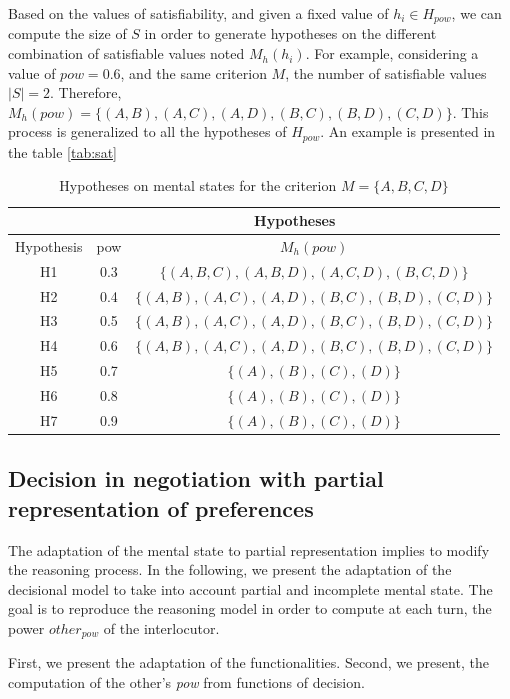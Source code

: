 \documentclass[sigconf]{aamas}  %
\begin{document}
	Based on the values of satisfiability, and given a fixed value of $h_i \in H_{pow}$, we can compute the size of $S$ in order to generate hypotheses on the different combination of satisfiable values  noted $M_h(h_i)$. For example, considering a value of $pow =0.6$, and the same criterion $M$, the number of satisfiable values $|S| = 2$. Therefore, $M_h(pow) = \{(A,B), (A,C), (A,D), (B,C), (B,D), (C,D)\}$. This process is generalized to all the hypotheses of $H_{pow}$. An example is presented in the table \ref{tab:sat}
	
	
	
	
	\begin{table}[h]
		\centering
		\caption{Hypotheses on mental states for the criterion $M=\{A, B, C, D\}$}
		\begin{tabular}{ |c|c|c| }
			\hline
			& \multicolumn{2}{c|}{Hypotheses}  \\
			\hline
			Hypothesis & pow & $M_h(pow)$ \\
			\hline
			H1&0.3&$\{ (A,B,C) , (A,B,D), (A,C,D), (B,C,D) \}$ \\
			\hline
			H2&0.4&$\{ (A,B), (A,C), (A,D), (B,C), (B,D), (C,D) \}$ \\
			\hline
			H3&0.5&$\{ (A,B), (A,C), (A,D), (B,C), (B,D), (C,D) \}$\\
			\hline
			H4&0.6&$\{ (A,B), (A,C), (A,D), (B,C), (B,D), (C,D) \}$ \\
			\hline
			H5&0.7&$\{ (A), (B), (C), (D) \}$\\
			\hline
			H6&0.8&$\{ (A), (B), (C), (D) \}$ \\
			\hline
			H7&0.9&$\{ (A), (B), (C), (D) \}$ \\
			\hline
		\end{tabular}

		\label{table:poss}
	\end{table}
	
	\subsection{Decision in negotiation with partial representation of preferences}
	The adaptation of the mental state to partial representation implies to modify the reasoning process. In the following, we present the adaptation of the decisional model to take into account partial and incomplete mental state. The goal is to reproduce the reasoning model in order to compute at each turn, the power $other_{pow}$ of the interlocutor. 
	
	First, we present the adaptation of the functionalities. Second, we present, the computation of the other's \emph{pow} from functions of decision.   
	
\end{document}
